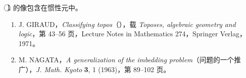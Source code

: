  \textcircled{1} 的像包含在惯性元中。
\begin{enumerate}
\item[{[1]}] J. GIRAUD，\emph{Classifying topos}（），载 \emph{Toposes, algebraic geometry and logic}，第 43--56 页，Lecture Notes in Mathematics 274，Springer Verlag，1971。
\item[{[2]}] M. NAGATA，\emph{A generalization of the imbedding problem}（问题的一个推广），\emph{J. Math. Kyoto} \textbf{3}, 1 (1963)，第 89--102 页。
\end{enumerate}
